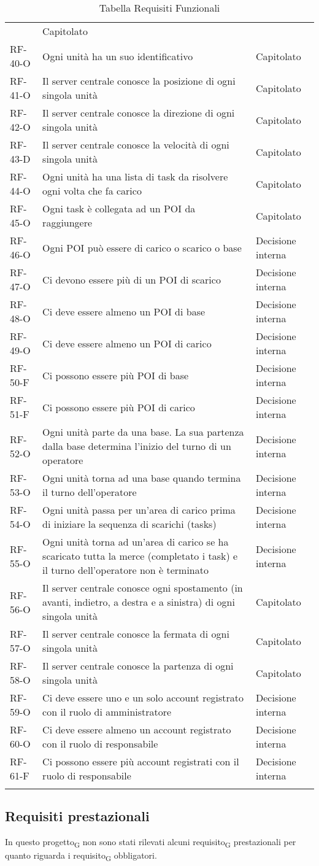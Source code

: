 \begin{longtable}{ 
		>{}p{} 
		>{}p{}
		>{\centering}p{} }
&
Capitolato
\tabularnewline
RF-40-O
&
Ogni unità ha un suo identificativo
&
Capitolato
\tabularnewline
RF-41-O
&
Il server centrale conosce la posizione di ogni singola unità
&
Capitolato
\tabularnewline
RF-42-O
&
Il server centrale conosce la direzione di ogni singola unità
&
Capitolato
\tabularnewline
RF-43-D
&
Il server centrale conosce la velocità di ogni singola unità
&
Capitolato
\tabularnewline
RF-44-O
&
Ogni unità ha una lista di task da risolvere ogni volta che fa carico
&
Capitolato
\tabularnewline
RF-45-O
&
Ogni task è collegata ad un POI da raggiungere
&
Capitolato
\tabularnewline
RF-46-O
&
Ogni POI può essere di carico o scarico o base
&
Decisione interna
\tabularnewline
RF-47-O
&
Ci devono essere più di un POI di scarico
&
Decisione interna
\tabularnewline
RF-48-O
&
Ci deve essere almeno un POI di base
&
Decisione interna
\tabularnewline
RF-49-O
&
Ci deve essere almeno un POI di carico
&
Decisione interna
\tabularnewline
RF-50-F
&
Ci possono essere più POI di base
&
Decisione interna
\tabularnewline
RF-51-F
&
Ci possono essere più POI di carico
&
Decisione interna
\tabularnewline
RF-52-O
&
Ogni unità parte da una base. La sua partenza dalla base determina l'inizio del turno di un operatore
&
Decisione interna
\tabularnewline
RF-53-O
&
Ogni unità torna ad una base quando termina il turno dell’operatore
&
Decisione interna
\tabularnewline
RF-54-O
&
Ogni unità passa per un’area di carico prima di iniziare la sequenza di scarichi (tasks)
&
Decisione interna
\tabularnewline
RF-55-O
&
Ogni unità torna ad un'area di carico se ha scaricato tutta la merce (completato i task) e il turno dell’operatore non è terminato
&
Decisione interna
\tabularnewline
RF-56-O
&
Il server centrale conosce ogni spostamento (in avanti, indietro, a destra e a sinistra) di ogni singola unità
&
Capitolato
\tabularnewline
RF-57-O
&
Il server centrale conosce la fermata di ogni singola unità
&
Capitolato
\tabularnewline
RF-58-O
&
Il server centrale conosce la partenza di ogni singola unità
&
Capitolato
\tabularnewline
RF-59-O
&
Ci deve essere uno e un solo account registrato con il ruolo di amministratore
&
Decisione interna
\tabularnewline
RF-60-O
&
Ci deve essere almeno un account registrato con il ruolo di responsabile
&
Decisione interna
\tabularnewline
RF-61-F
&
Ci possono essere più account registrati con il ruolo di responsabile
&
Decisione interna
\tabularnewline

\caption{Tabella Requisiti Funzionali\label{ Tabella Requisiti Funzionali}}
\end{longtable}
\subsection{Requisiti prestazionali}
In questo progetto\textsubscript{G} non sono stati rilevati alcuni requisito\textsubscript{G} prestazionali per quanto riguarda i requisito\textsubscript{G} obbligatori.
\pagebreak
